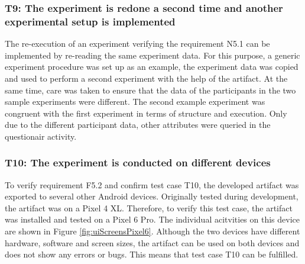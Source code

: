 \newpage\subsubsection*{T9: The experiment is redone a second time and another experimental setup is implemented}

The re-execution of an experiment verifying the requirement N5.1 can be implemented by re-reading the same experiment data. For this purpose, a generic experiment procedure was set up as an example, the experiment data was copied and used to perform a second experiment with the help of the artifact. At the same time, care was taken to ensure that the data of the participants in the two sample experiments were different. The second example experiment was congruent with the first experiment in terms of structure and execution. Only due to the different participant data, other attributes were queried in the questionair activity.




\vspace{1cm}

\newpage\subsubsection*{T10: The experiment is conducted on different devices}

To verify requirement F5.2 and confirm test case T10, the developed artifact was exported to several other Android devices. Originally tested during development, the artifact was on a Pixel 4 XL. Therefore, to verify this test case, the artifact was installed and tested on a Pixel 6 Pro. The individual acitvities on this device are shown in Figure \ref{fig:uiScreensPixel6}. Although the two devices have different hardware, software and screen sizes, the artifact can be used on both devices and does not show any errors or bugs. This means that test case T10 can be fulfilled.

